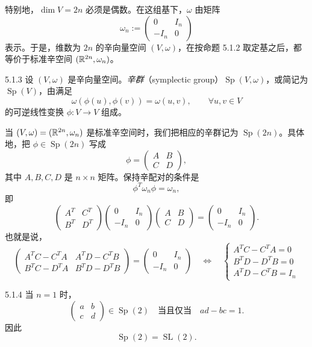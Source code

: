 
特别地，$\dim V=2n$ 必须是偶数。在这组基下，$\omega$ 由矩阵
\[
\omega_n:=\begin{pmatrix}0&I_n\\-I_n&0\end{pmatrix}
\]
表示。于是，维数为 $2n$ 的辛向量空间 $(V,\omega)$，在按命题 5.1.2 取定基之后，都等价于标准辛空间 $(\mathbb{R}^{2n},\omega_n)$。

\begin{definition}{5.1.3}
设 $(V,\omega)$ 是辛向量空间。\emph{辛群}（symplectic group）$\operatorname{Sp}(V,\omega)$，或简记为 $\operatorname{Sp}(V)$，由满足
\[
\omega(\phi(u),\phi(v))=\omega(u,v),\qquad \forall u,v\in V
\]
的可逆线性变换 $\phi:V\to V$ 组成。
\end{definition}

当 $(V,\omega)=(\mathbb{R}^{2n},\omega_n)$ 是标准辛空间时，我们把相应的辛群记为 $\operatorname{Sp}(2n)$。具体地，把 $\phi\in\operatorname{Sp}(2n)$ 写成
\[
\phi=\begin{pmatrix}A&B\\C&D\end{pmatrix},
\]
其中 $A,B,C,D$ 是 $n\times n$ 矩阵。保持辛配对的条件是
\[
\phi^T\omega_n\phi=\omega_n,
\]
即
\[
\begin{pmatrix}A^T&C^T\\B^T&D^T\end{pmatrix}
\begin{pmatrix}0&I_n\\-I_n&0\end{pmatrix}
\begin{pmatrix}A&B\\C&D\end{pmatrix}
=\begin{pmatrix}0&I_n\\-I_n&0\end{pmatrix}.
\]
也就是说，
\[
\begin{pmatrix}A^TC-C^TA&A^TD-C^TB\\B^TC-D^TA&B^TD-D^TB\end{pmatrix}
=\begin{pmatrix}0&I_n\\-I_n&0\end{pmatrix}
\quad\Longleftrightarrow\quad
\begin{cases}
A^TC-C^TA=0\\
B^TD-D^TB=0\\
A^TD-C^TB=I_n
\end{cases}
\]

\begin{example}{5.1.4}
当 $n=1$ 时，
\[
\begin{pmatrix}a&b\\c&d\end{pmatrix}\in\operatorname{Sp}(2)
\quad\text{当且仅当}\quad ad-bc=1.
\]
因此
\[
\operatorname{Sp}(2)=\operatorname{SL}(2).
\]
\end{example}

